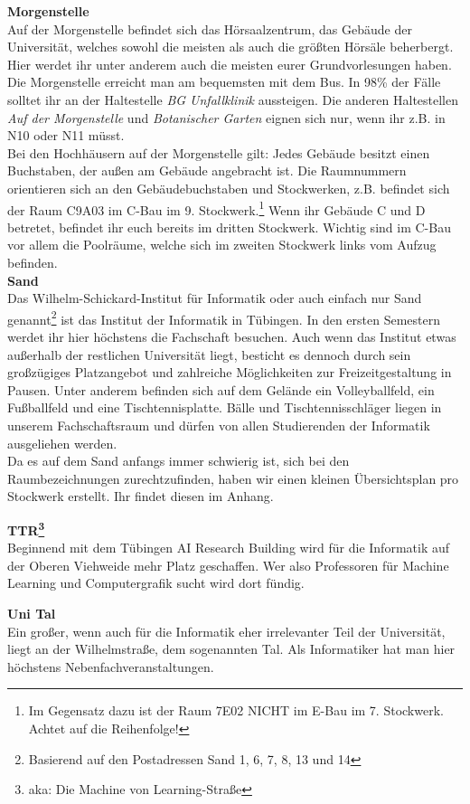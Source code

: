 \textbf{Morgenstelle}\\
Auf der Morgenstelle befindet sich das Hörsaalzentrum, das Gebäude der Universität, welches sowohl die meisten als auch die größten Hörsäle beherbergt. Hier werdet ihr unter anderem auch die meisten eurer Grundvorlesungen haben.\\
Die Morgenstelle erreicht man am bequemsten mit dem Bus. In 98\% der Fälle solltet ihr an der Haltestelle \emph{BG Unfallklinik} aussteigen. Die anderen Haltestellen \emph{Auf der Morgenstelle} und \emph{Botanischer Garten} eignen sich nur, wenn ihr z.B. in N10 oder N11 müsst.\\ Bei den Hochhäusern auf der Morgenstelle gilt: Jedes Gebäude besitzt einen Buchstaben, der außen am Gebäude angebracht ist.  Die Raumnummern orientieren sich an den Gebäudebuchstaben und Stockwerken, z.B. befindet sich der Raum C9A03 im C-Bau im 9. Stockwerk.\footnote{Im Gegensatz dazu ist der Raum 7E02 NICHT im E-Bau im 7. Stockwerk. Achtet auf die Reihenfolge!} Wenn ihr Gebäude C und D betretet, befindet ihr euch bereits im dritten Stockwerk. Wichtig sind im C-Bau vor allem die Poolräume, welche sich im zweiten Stockwerk links vom Aufzug befinden. \\

\textbf{Sand}\\
Das Wilhelm-Schickard-Institut für Informatik oder auch einfach nur Sand genannt\footnote{Basierend auf den Postadressen Sand 1, 6, 7, 8, 13 und 14} ist das Institut der Informatik in Tübingen. In den ersten Semestern werdet ihr hier höchstens die Fachschaft besuchen. Auch wenn das Institut etwas außerhalb der restlichen Universität liegt, besticht es dennoch durch sein großzügiges Platzangebot und zahlreiche Möglichkeiten zur Freizeitgestaltung in Pausen. Unter anderem befinden sich auf dem Gelände ein Volleyballfeld, ein Fußballfeld und eine Tischtennisplatte. Bälle und Tischtennisschläger liegen in unserem Fachschaftsraum und dürfen von allen Studierenden der Informatik ausgeliehen werden.\\
Da es auf dem Sand anfangs immer schwierig ist, sich bei den Raumbezeichnungen zurechtzufinden, haben wir einen kleinen Übersichtsplan pro Stockwerk erstellt. Ihr findet diesen im Anhang.

\textbf{TTR\footnote{aka: Die Machine von Learning-Straße}}\\
Beginnend mit dem Tübingen AI Research Building wird für die Informatik auf der Oberen Viehweide mehr Platz geschaffen. Wer also Professoren für Machine Learning und Computergrafik sucht wird dort fündig.

\textbf{Uni Tal}\\
Ein großer, wenn auch für die Informatik eher irrelevanter Teil der Universität, liegt an der Wilhelmstraße, dem sogenannten Tal. Als Informatiker hat man hier höchstens Nebenfachveranstaltungen.
\vfill
